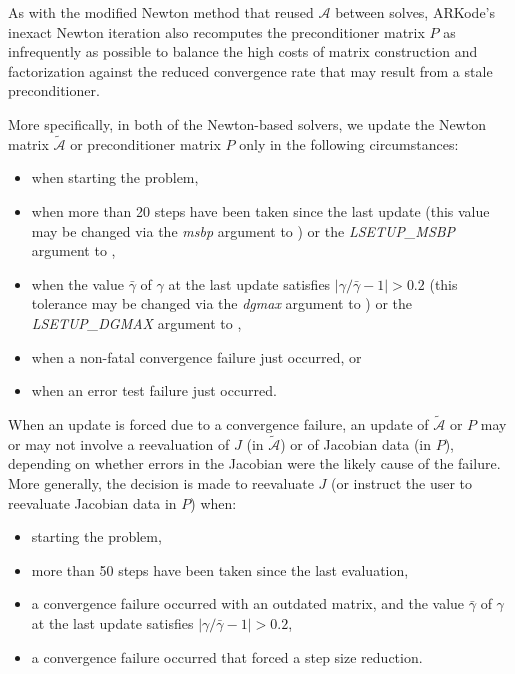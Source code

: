 \documentclass[letterpaper,10pt,english]{sphinxmanual}
\begin{document}
As with the modified Newton method that reused ${\mathcal A}$ between solves,
ARKode's inexact Newton iteration also recomputes the preconditioner
matrix $P$ as infrequently as possible to balance the high costs
of matrix construction and factorization against the reduced
convergence rate that may result from a stale preconditioner.

More specifically, in both of the Newton-based solvers, we update the
Newton matrix $\tilde{\mathcal A}$ or preconditioner matrix $P$
only in the following circumstances:
\begin{itemize}
\item {} 
when starting the problem,

\item {} 
when more than 20 steps have been taken since the last update (this
value may be changed via the \emph{msbp} argument to
{\hyperref[c_interface/User_callable:ARKodeSetMaxStepsBetweenLSet]{}}) or the \emph{LSETUP\_MSBP}
argument to {\hyperref[f_interface/Usage:f/_/FARKSETIIN]{}},

\item {} 
when the value $\bar{\gamma}$ of $\gamma$ at the last
update satisfies $\left|\gamma/\bar{\gamma} - 1\right| > 0.2$
(this tolerance may be changed via the \emph{dgmax} argument to
{\hyperref[c_interface/User_callable:ARKodeSetDeltaGammaMax]{}}) or the \emph{LSETUP\_DGMAX}
argument to {\hyperref[f_interface/Usage:f/_/FARKSETRIN]{}},

\item {} 
when a non-fatal convergence failure just occurred, or

\item {} 
when an error test failure just occurred.

\end{itemize}

When an update is forced due to a convergence failure, an update of
$\tilde{\mathcal A}$ or $P$ may or may not involve a reevaluation of
$J$ (in $\tilde{\mathcal A}$) or of Jacobian data (in $P$),
depending on whether errors in the Jacobian were the likely cause of the
failure.  More generally, the decision is made to reevaluate $J$
(or instruct the user to reevaluate Jacobian data in $P$) when:
\begin{itemize}
\item {} 
starting the problem,

\item {} 
more than 50 steps have been taken since the last evaluation,

\item {} 
a convergence failure occurred with an outdated matrix, and the
value $\bar{\gamma}$ of $\gamma$ at the last update
satisfies $\left|\gamma/\bar{\gamma} - 1\right| > 0.2$,

\item {} 
a convergence failure occurred that forced a step size reduction.

\end{itemize}
\end{document}
